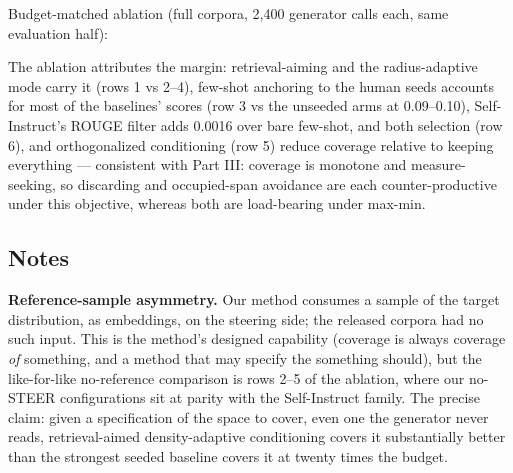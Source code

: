 \documentclass[11pt]{article}
\theoremstyle{plain}
\theoremstyle{definition}
\begin{document}
Budget-matched ablation (full corpora, 2,400 generator calls each, same evaluation half):

\begin{table}[htbp]
\centering
\small
{}
\end{table}

The ablation attributes the margin: retrieval-aiming and the radius-adaptive mode carry it (rows 1 vs 2--4), few-shot anchoring to the human seeds accounts for most of the baselines' scores (row 3 vs the unseeded arms at 0.09--0.10), Self-Instruct's ROUGE filter adds 0.0016 over bare few-shot, and both selection (row 6), and orthogonalized conditioning (row 5) reduce coverage relative to keeping everything --- consistent with Part III: coverage is monotone and measure-seeking, so discarding and occupied-span avoidance are each counter-productive under this objective, whereas both are load-bearing under max-min.

\subsection{Notes}
\textbf{Reference-sample asymmetry.} Our method consumes a sample of the target distribution, as embeddings, on the steering side; the released corpora had no such input. This is the method's designed capability (coverage is always coverage \emph{of} something, and a method that may specify the something should), but the like-for-like no-reference comparison is rows 2--5 of the ablation, where our no-STEER configurations sit at parity with the Self-Instruct family. The precise claim: given a specification of the space to cover, even one the generator never reads, retrieval-aimed density-adaptive conditioning covers it substantially better than the strongest seeded baseline covers it at twenty times the budget.
\end{document}
